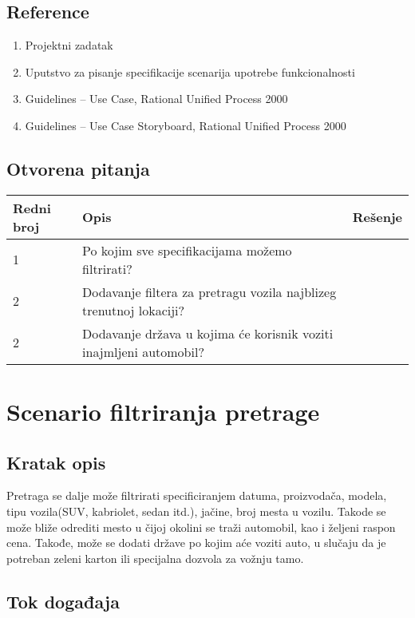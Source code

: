 \documentclass[12pt]{article}
\begin{document}
\subsection{Reference}
\begin{enumerate}
   \item Projektni zadatak
   \item Uputstvo za pisanje specifikacije scenarija upotrebe funkcionalnosti
   \item  Guidelines – Use Case, Rational Unified Process 2000
   \item  Guidelines – Use Case Storyboard, Rational Unified Process 2000
 \end{enumerate}
\subsection{Otvorena pitanja}


\begin{center}
\begin{tabular}{ | m{2cm} | m{7cm}| m{7cm} | } 
\hline
Redni broj& Opis & Rešenje \\ 
\hline
1 & Po kojim sve specifikacijama možemo filtrirati? & \\ 
\hline
2 & Dodavanje filtera za pretragu vozila najblizeg trenutnoj lokaciji? & \\ 
\hline
2 & Dodavanje država u kojima će korisnik voziti inajmljeni automobil? & \\
\hline
\end{tabular}
\end{center}

    

\section{Scenario filtriranja pretrage}
\subsection{Kratak opis}
Pretraga se dalje može filtrirati specificiranjem datuma, proizvodača, modela, tipu vozila(SUV, kabriolet, sedan itd.), jačine, broj mesta u vozilu.
Takode se može bliže odrediti mesto u čijoj okolini se traži automobil, kao i željeni raspon cena. Takođe, može se dodati države po kojim aće voziti auto, u slučaju da je potreban zeleni karton ili specijalna dozvola za vožnju tamo.
\subsection{Tok događaja}
\end{document}
